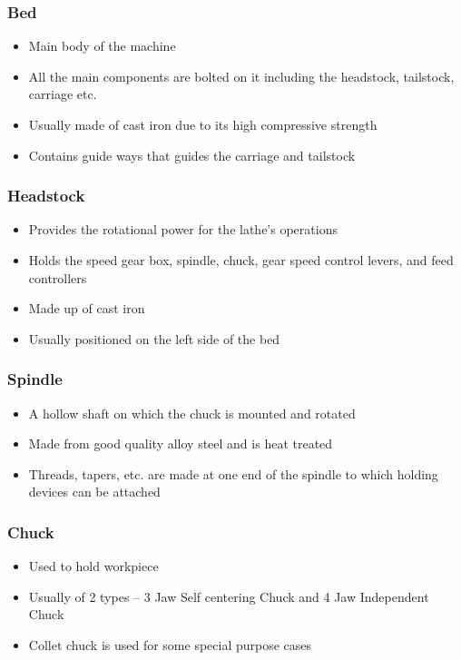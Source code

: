 \documentclass{article}
\begin{document}
\subsubsection*{Bed}
\begin{itemize}
  \item Main body of the machine
  \item All the main components are bolted on it 
  including the headstock, tailstock, carriage 
  etc.
  \item Usually made of cast iron due to its high 
  compressive strength
  \item Contains guide ways that guides the 
  carriage and tailstock
\end{itemize}

\subsubsection*{Headstock}
\begin{itemize}
  \item Provides the rotational power for the lathe’s operations
  \item Holds the speed gear box, spindle, chuck, gear speed control levers, and feed controllers
  \item Made up of cast iron
  \item Usually positioned on the left side of the bed
\end{itemize}

\subsubsection*{Spindle}
\begin{itemize}
  \item A hollow shaft on which the chuck is mounted and rotated
  \item Made from good quality alloy steel and is heat treated
  \item Threads, tapers, etc. are made at one end of the spindle to which holding devices can be attached
\end{itemize}

\subsubsection*{Chuck}
\begin{itemize}
  \item Used to hold workpiece
  \item Usually of 2 types – 3 Jaw Self centering Chuck and 4 Jaw Independent Chuck
  \item Collet chuck is used for some special purpose cases
\end{itemize}
\end{document}
